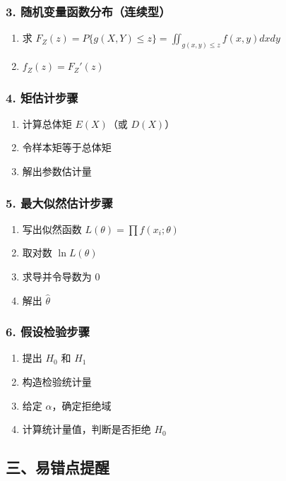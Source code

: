 \documentclass[12pt,a4paper]{ctexart}
\begin{document}
\subsubsection*{3. 随机变量函数分布（连续型）}
\begin{enumerate}[noitemsep]
    \item 求 $F_Z(z) = P\{g(X,Y) \le z\} = \iint_{g(x,y) \le z} f(x,y) dx dy$
    \item $f_Z(z) = F_Z'(z)$
\end{enumerate}

\subsubsection*{4. 矩估计步骤}
\begin{enumerate}[noitemsep]
    \item 计算总体矩 $E(X)$（或 $D(X)$）
    \item 令样本矩等于总体矩
    \item 解出参数估计量
\end{enumerate}

\subsubsection*{5. 最大似然估计步骤}
\begin{enumerate}[noitemsep]
    \item 写出似然函数 $L(\theta) = \prod f(x_i; \theta)$
    \item 取对数 $\ln L(\theta)$
    \item 求导并令导数为 0
    \item 解出 $\hat{\theta}$
\end{enumerate}

\subsubsection*{6. 假设检验步骤}
\begin{enumerate}[noitemsep]
    \item 提出 $H_0$ 和 $H_1$
    \item 构造检验统计量
    \item 给定 $\alpha$，确定拒绝域
    \item 计算统计量值，判断是否拒绝 $H_0$
\end{enumerate}

\subsection*{三、易错点提醒}
\end{document}
